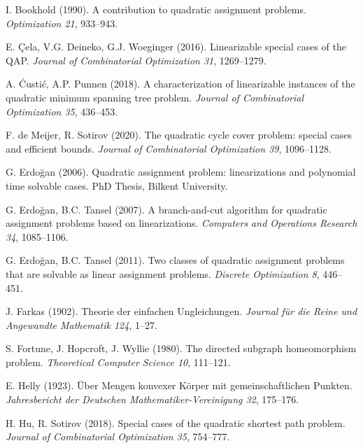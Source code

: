 \documentclass[runningheads]{llncs}
\begin{document}
\begin{thebibliography}{18}

{I. Bookhold} (1990).
A contribution to quadratic assignment problems.
\emph{Optimization 21}, 933--943.

{E. \c{C}ela, V.G. Deineko, G.J. Woeginger} (2016).
Linearizable special cases of the {QAP}.
\emph{Journal of Combinatorial Optimization 31}, 1269--1279.

{A. {\'C}usti{\'c}, A.P. Punnen} (2018).
A characterization of linearizable instances of the quadratic minimum spanning tree problem.
\emph{Journal of Combinatorial Optimization 35}, 436--453.

{F. de Meijer, R. Sotirov} (2020).
The quadratic cycle cover problem: special cases and efficient bounds.
\emph{Journal of Combinatorial Optimization 39}, 1096--1128.

{G. Erdo\u{g}an} (2006).
Quadratic assignment problem: linearizations and polynomial time solvable cases.
PhD Thesis, Bilkent University.

{G. Erdo\u{g}an, B.C. Tansel} (2007).
A branch-and-cut algorithm for quadratic assignment problems based on linearizations.
\emph{Computers and Operations Research 34}, 1085--1106.

{G. Erdo\u{g}an, B.C. Tansel} (2011).
Two classes of quadratic assignment problems that are solvable as linear assignment problems.
\emph{Discrete Optimization 8}, 446--451.

{J. Farkas} (1902).
Theorie der einfachen {U}ngleichungen.
\emph{Journal f\"ur die Reine und Angewandte Mathematik 124}, 1--27.

{S. Fortune, J. Hopcroft, J. Wyllie} (1980).
The directed subgraph homeomorphism problem.
\emph{Theoretical Computer Science 10}, 111--121.

{E. Helly} (1923).
\"Uber {M}engen konvexer {K}\"orper mit gemeinschaftlichen {P}unkten.
\emph{Jahresbericht der {D}eutschen {M}athematiker-{V}ereinigung 32}, 175--176.

{H. Hu, R. Sotirov} (2018).
Special cases of the quadratic shortest path problem.
\emph{Journal of Combinatorial Optimization 35}, 754--777.


\end{thebibliography}
\end{document}
